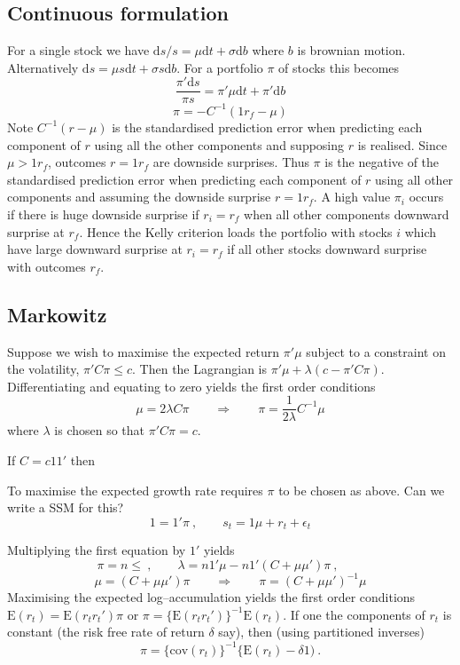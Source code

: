 \documentclass[authoryear]{elsarticle}
\newcommand{\E}{\mathrm{E}}
\newcommand{\cov}{\mathrm{cov}}
\newcommand{\eps}{\epsilon}
\newcommand{\de}{\mathrm{d}}
\newcommand{\cq}{\ , \qquad}
\begin{document}
\subsection{Continuous formulation}
For a single stock we have $\de s/s = \mu\de t + \sigma\de b$ where $b$ is brownian motion.  Alternatively 
$\de s=\mu s\de t + \sigma s\de b$.    For a portfolio $\pi$ of stocks this becomes
$$
\frac{\pi'\de s}{\pi s} =\pi'\mu\de t + \pi'\de b
$$
$$
\pi=-C^{-1}(1r_f-\mu)
$$
Note $C^{-1}(r-\mu)$ is the standardised prediction error when predicting each component of $r$ using all the other components and supposing $r$ is realised.   Since $\mu>1r_f$,  outcomes $r=1r_f$ are downside surprises.
Thus  $\pi$ is the negative of the standardised prediction error when predicting each component of $r$ using all other components and assuming the downside surprise $r=1r_f$.   A high value $\pi_i$ occurs if  there is huge downside surprise if $r_i=r_f$   when all other components  downward surprise at  $r_f$.    Hence the Kelly criterion loads the portfolio with stocks $i$ which have  large downward surprise at $r_i=r_f$ if all other stocks downward surprise with outcomes $r_f$.      



\subsection{Markowitz}

Suppose we wish to maximise the expected return $\pi'\mu$ subject to a constraint on the volatility, $\pi'C\pi\le c$.  Then the Lagrangian is 
$\pi'\mu +\lambda (c-\pi'C\pi)$.   Differentiating and equating to zero yields the first order conditions
$$
\mu = 2\lambda C\pi\qquad \Rightarrow\qquad \pi = \frac{1}{2\lambda} C^{-1}\mu 
$$
where $\lambda$ is chosen so that $\pi'C\pi=c$. 
 

 If $C=c11'$ then

To maximise the expected growth rate requires $\pi$ to be chosen as above.  Can we write a SSM for this?
$$
1=1'\pi\cq s_t=1\mu + r_t + \eps_t 
$$


Multiplying the first equation by $1'$ yields
$$
\pi=n\le \cq\lambda=n1'\mu - n1'(C+\mu\mu')\pi\cq  
$$
$$
\mu = (C+\mu\mu')\pi\qquad\Rightarrow\qquad \pi=(C+\mu\mu')^{-1}\mu
$$
Maximising the expected log--accumulation yields the first order conditions
$
\E(r_t) = \E(r_tr_t')\pi
$ or $\pi=\{\E(r_tr_t')\}^{-1}\E(r_t)$.  If one the components of $r_t$ is constant (the risk free rate of return $\delta$ say), then (using partitioned inverses)
$$
\pi = \{\cov(r_t)\}^{-1}\{\E(r_t)-\delta 1)\ .
$$
\end{document}

